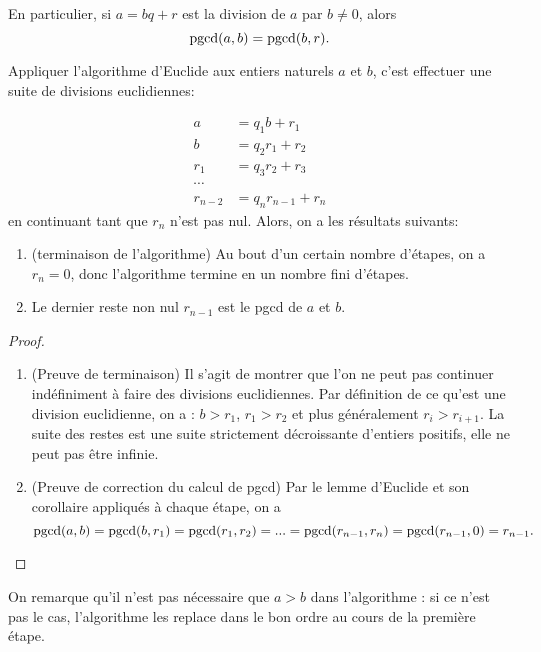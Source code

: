 \begin{corollaire} En particulier, si $a = bq+r$ est la division de $a$ par $b\neq 0$, alors 
\[ \operatorname{pgcd}(a,b) = \operatorname{pgcd}(b,r).\]
\end{corollaire}

\begin{theoreme}

Appliquer l'algorithme d'Euclide aux entiers naturels $a$ et $b$, c'est effectuer une suite de divisions euclidiennes:

\begin{align*}
a &= q_1 b + r_1\\
b &= q_2 r_1+r_2\\
r_1 &= q_3 r_2+ r_3\\
\cdots & \\
r_{n-2} &= q_nr_{n-1}+r_n
\end{align*}
en continuant tant que $r_n$ n'est pas nul. Alors, on a les résultats suivants:

\begin{enumerate}
\item (terminaison de l'algorithme) Au bout d'un certain nombre d'étapes, on a $r_n=0$, donc l'algorithme termine en un nombre fini d'étapes.
\item Le dernier reste non nul $r_{n-1}$ est le pgcd de $a$ et $b$.
\end{enumerate}
\end{theoreme}
\begin{proof}

\begin{enumerate}
\item (Preuve de terminaison) Il s'agit de montrer que l'on ne peut pas continuer indéfiniment à faire des divisions euclidiennes. Par définition de ce qu'est une division euclidienne, on a  : $b>r_1$, $r_1>r_2$ et plus généralement $r_i>r_{i+1}$. La suite des restes est une suite strictement décroissante d'entiers positifs, elle ne peut pas être infinie.
\item (Preuve de correction du calcul de pgcd) Par le lemme d'Euclide et son corollaire appliqués à chaque étape, on a 
\[
\operatorname{pgcd}(a,b) = \operatorname{pgcd}(b,r_1)=\operatorname{pgcd}(r_1,r_2) = ... = \operatorname{pgcd}(r_{n-1},r_n) = \operatorname{pgcd}(r_{n-1},0) = r_{n-1}.
\]

\end{enumerate}
\end{proof}

On remarque qu'il n'est pas nécessaire que $a>b$ dans l'algorithme : si ce n'est pas le cas, l'algorithme les replace dans le bon ordre au cours de la première étape.

